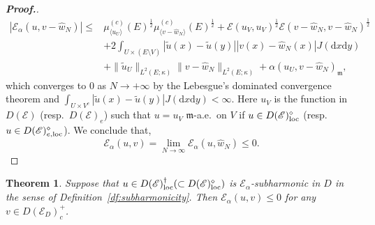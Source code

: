 \documentclass[12pt,a4paper]{article}
\newtheorem{thm}{Theorem}[section]
\renewcommand{\d}{\mathrm{d}}
\newcommand{\m}{\mathfrak{m} }
\newcommand{\loc}{{\rm loc}}
\newcommand{\1}{{\bf 1}}
\newcommand{\wh}{\widehat}
\renewcommand{\wh}{\widehat}
\begin{document}
\begin{proof}[{\bf Proof.}]
\begin{align*}
|\mathscr{E}_{\alpha}(u,v-\wh{w}_N)|\leq& 
\mu_{\langle u_U\rangle}^{(c)}(E)^{\frac12}\mu_{\langle v-\wh{w}_N\rangle}^{(c)}(E)^{\frac12}+
\mathscr{E}(u_V,u_V)^{\frac12}\mathscr{E}(v-\wh{w}_N,v-\wh{w}_N)^{\frac12}
\\
&+2\int_{U\times (E\setminus V)}|\tilde{u}(x)-\tilde{u}(y)|
|v(x)-\wh{w}_N(x)|J({\d} x{\d} y)\\
&+\|\tilde{u}_U\|_{L^2(E;\kappa)}\|v-\wh{w}_N\|_{L^2(E;\kappa)}
+\alpha(u_U,v-\wh{w}_N)_{\m},
\end{align*}
which converges to $0$ as $N \to +\infty$ by the Lebesgue's dominated convergence theorem and $\int_{U\times V^c}|\tilde{u}(x)-\tilde{u}(y)|J({\d} x{\d} y)<\infty$. Here $u_V$ is the function in $D(\mathscr{E})$ (resp.~$D(\mathscr{E})_e$) such that $u=u_V$ $\m$-a.e.~on $V$ if $u\in D(\mathscr{E})^{\diamond}_{\loc}$ (resp.~$u\in D(\mathscr{E})^{\diamond}_{e,\loc}$).  
We conclude that, 
\begin{equation*}
\mathscr{E}_{\alpha}(u,v)=\lim_{N\to\infty}\mathscr{E}_{\alpha}(u,\wh{w}_N)\leq0.
\end{equation*}
\end{proof}
\begin{thm}\label{thm:CharacSubhamonicity*}
Suppose that $u\in D(\mathscr{E})_{\loc}^{\dag}(\subset 
D(\mathscr{E})_{\loc}^{\diamond})$ is $\mathscr{E}_{\alpha}$-subharmonic in $D$ in the sense of Definition~\ref{df:subharmonicity}. 
Then $\mathscr{E}_{\alpha}(u,v)\leq0$ for any $v\in D(\mathscr{E}_D)_c^+$. 
\end{thm}
\end{document}
